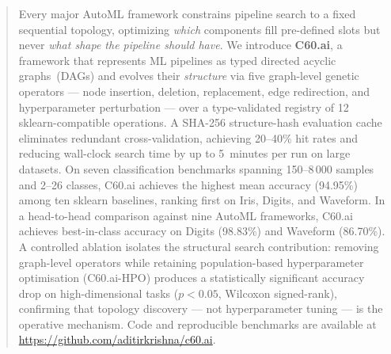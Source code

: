 \documentclass{article}
\theoremstyle{definition}
\theoremstyle{plain}
\theoremstyle{remark}
\begin{document}

\printAffiliationsAndNotice{}

\begin{abstract}
Every major AutoML framework constrains pipeline search to a fixed sequential
topology, optimizing \emph{which} components fill pre-defined slots but
never \emph{what shape the pipeline should have}.
We introduce \textbf{C60.ai}, a framework that represents ML pipelines as
typed directed acyclic graphs~(DAGs) and evolves their \emph{structure} via
five graph-level genetic operators — node insertion, deletion, replacement,
edge redirection, and hyperparameter perturbation — over a type-validated
registry of 12 sklearn-compatible operations.
A SHA-256 structure-hash evaluation cache eliminates redundant cross-validation,
achieving 20--40\% hit rates and reducing wall-clock search time by up to
5~minutes per run on large datasets.
On seven classification benchmarks spanning 150--8\,000 samples and 2--26
classes, C60.ai achieves the highest mean accuracy (94.95\%) among ten
sklearn baselines, ranking first on Iris, Digits, and Waveform.
In a head-to-head comparison against nine AutoML frameworks, C60.ai achieves
best-in-class accuracy on Digits (98.83\%) and Waveform (86.70\%).
A controlled ablation isolates the structural search contribution:
removing graph-level operators while retaining population-based hyperparameter
optimisation (C60.ai-HPO) produces a statistically significant accuracy drop
on high-dimensional tasks ($p < 0.05$, Wilcoxon signed-rank), confirming
that topology discovery — not hyperparameter tuning — is the operative
mechanism.
Code and reproducible benchmarks are available at
\url{https://github.com/aditirkrishna/c60.ai}.
\end{abstract}
\end{document}
